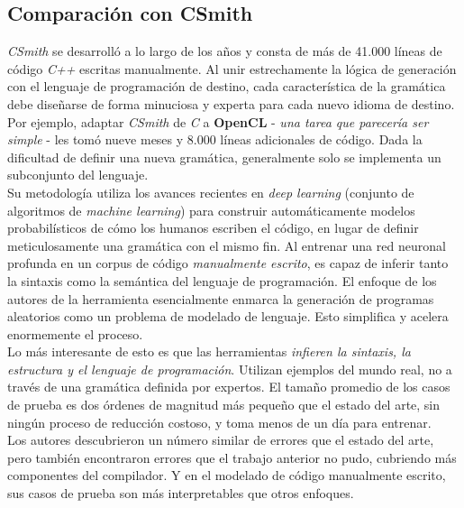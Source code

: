 \subsection{Comparación con CSmith}
\textit{CSmith} se desarrolló a lo largo de los años y consta de más de 41.000 líneas de código \textit{C++} escritas manualmente. Al unir estrechamente la lógica de generación con el lenguaje de programación de destino, cada característica de la gramática debe diseñarse de forma minuciosa y experta para cada nuevo idioma de destino.\\

Por ejemplo, adaptar \textit{CSmith} de \textit{C} a \textbf{OpenCL}\cite{Boujarwah1997CompilerTC} - \textit{una tarea que parecería ser simple} - les tomó nueve meses y 8.000 líneas adicionales de código. Dada la dificultad de definir una nueva gramática, generalmente solo se implementa un subconjunto del lenguaje.\\

Su metodología utiliza los avances recientes en \textit{deep learning} (conjunto de algoritmos de \textit{machine learning}) para construir automáticamente modelos probabilísticos de cómo los humanos escriben el código, en lugar de definir meticulosamente una gramática con el mismo fin. Al entrenar una red neuronal profunda en un corpus de código \textit{manualmente escrito}, es capaz de inferir tanto la sintaxis como la semántica del lenguaje de programación. El enfoque de los autores de la herramienta esencialmente enmarca la generación de programas aleatorios como un problema de modelado de lenguaje. Esto simplifica y acelera enormemente el proceso.\\

Lo más interesante de esto es que las herramientas \textit{infieren la sintaxis, la estructura y el lenguaje de programación}. Utilizan ejemplos del mundo real, no a través de una gramática definida por expertos. El tamaño promedio de los casos de prueba es dos órdenes de magnitud más pequeño que el estado del arte, sin ningún proceso de reducción costoso, y toma menos de un día para entrenar.\\

Los autores descubrieron un número similar de errores que el estado del arte, pero también encontraron errores que el trabajo anterior no pudo, cubriendo más componentes del compilador. Y en el modelado de código manualmente escrito, sus casos de prueba son más interpretables que otros enfoques.\\

